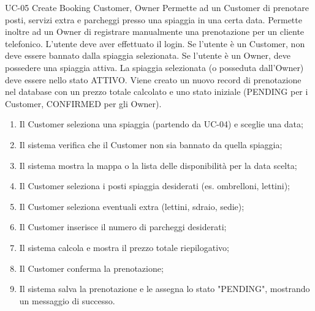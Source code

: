 \usecasetable
{UC-05}
{Create Booking}
{Customer, Owner}
{Permette ad un Customer di prenotare posti, servizi extra e parcheggi presso una spiaggia in una certa data. Permette inoltre ad un Owner di registrare manualmente una prenotazione per un cliente telefonico.}
{L'utente deve aver effettuato il login. Se l'utente è un Customer, non deve essere bannato dalla spiaggia selezionata. Se l'utente è un Owner, deve possedere una spiaggia attiva. La spiaggia selezionata (o posseduta dall'Owner) deve essere nello stato ATTIVO.}
{Viene creato un nuovo record di prenotazione nel database con un prezzo totale calcolato e uno stato iniziale (PENDING per i Customer, CONFIRMED per gli Owner).}
{
	\begin{enumerate}[nosep, leftmargin=*]
		\item Il Customer seleziona una spiaggia (partendo da UC-04) e sceglie una data;
		\item Il sistema verifica che il Customer non sia bannato da quella spiaggia;
		\item Il sistema mostra la mappa o la lista delle disponibilità per la data scelta;
		\item Il Customer seleziona i posti spiaggia desiderati (es. ombrelloni, lettini);
		\item Il Customer seleziona eventuali extra (lettini, sdraio, sedie);
		\item Il Customer inserisce il numero di parcheggi desiderati;
		\item Il sistema calcola e mostra il prezzo totale riepilogativo;
		\item Il Customer conferma la prenotazione;
		\item Il sistema salva la prenotazione e le assegna lo stato "PENDING", mostrando un messaggio di successo.
	\end{enumerate}
}
